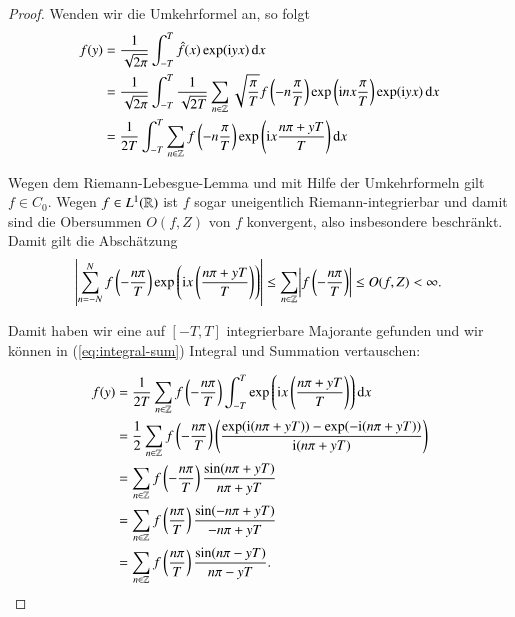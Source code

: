 \begin{proof}
  Wenden wir die Umkehrformel an, so folgt
  \begin{equation}
    \label{eq:integral-sum}
    \begin{split}
      f(y)
      &= \frac{1}{\sqrt{2\pi}} \int_{-T}^T{\fouriertransform{f}(x) \exp(\i yx) \dif x} \\
      &= \frac{1}{\sqrt{2\pi}} \int_{-T}^T{\frac{1}{\sqrt{2T}} \sum_{n \in \Z}{\sqrt{\frac{\pi}{T}} f\left(-n\frac{\pi}{T} \right) \exp\left(\i n x\frac{\pi}{T}\right)} \exp(\i yx)\dif x} \\
      &= \frac{1}{2T}\int_{-T}^T{\sum_{n \in \Z}{f\left(-n\frac{\pi}{T}\right) \exp\left(\i x\frac{n\pi + yT}{T}\right)} \dif x}
    \end{split}
  \end{equation}

  Wegen dem Riemann-Lebesgue-Lemma und mit Hilfe der Umkehrformeln gilt $f \in C_0$.
  Wegen $f \in L^1(\mathbb{R})$ ist $f$ sogar uneigentlich Riemann-integrierbar und damit sind die Obersummen $O(f,Z)$ von $f$ konvergent, also insbesondere beschränkt.
  Damit gilt die Abschätzung
  \begin{equation*}
    \abs{\sum_{n=-N}^N{f \left(- \frac{n\pi}{T} \right) \exp \left( \mathrm{i} x \left( \frac{n\pi + yT}{T} \right) \right)}}
    \leq \sum_{n \in \mathbb{Z}}{\abs{f \left( -\frac{n\pi}{T} \right)}}
    \leq O(f,Z)
    < \infty.
  \end{equation*}

  Damit haben wir eine auf $[-T,T]$ integrierbare Majorante gefunden und wir können in (\ref{eq:integral-sum}) Integral und Summation vertauschen:

  \begin{equation*}
    \begin{split}
      f(y)
      &= \frac{1}{2T} \sum_{n \in \Z}{f \left(-\frac{n\pi}{T}\right) \int_{-T}^T{\exp \left(\i x \left( \frac{n\pi + yT}{T} \right) \right) \dif x}} \\
      &= \frac{1}{2} \sum_{n \in \Z}{f \left(-\frac{n\pi}{T} \right) \left(\frac{\exp(\i(n\pi + yT)) - \exp(-\i(n\pi + yT))}{\i(n\pi + yT)} \right)} \\
      &= \sum_{n \in \Z}{f \left(-\frac{n\pi}{T}\right)\frac{\sin(n\pi + yT)}{n\pi + yT}} \\
      &= \sum_{n \in \Z}{f \left(\frac{n\pi}{T} \right) \frac{\sin(-n\pi + yT)}{-n\pi + yT}} \\
      &= \sum_{n \in \Z}{f \left(\frac{n\pi}{T} \right) \frac{\sin(n\pi - yT)}{n\pi - yT}}.
    \end{split}
  \end{equation*}
\end{proof}
